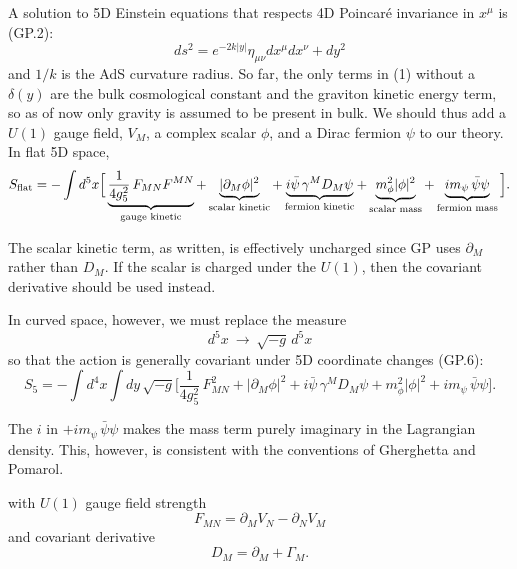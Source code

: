 \documentclass[11pt]{article}
\begin{document}
A solution to 5D Einstein equations that respects 4D Poincar\'e invariance in $x^{\mu}$ is (GP.2):
\begin{equation}
ds^{2}=e^{-2k|y|}\eta_{\mu\nu}dx^{\mu}dx^{\nu}+dy^{2}
\end{equation}
and $1/k$ is the AdS curvature radius. So far, the only terms in (1) without a $\delta(y)$ are the bulk cosmological constant and the graviton kinetic energy term, so as of now only gravity is assumed to be present in bulk. We should thus add a $U(1)$ gauge field, $V_M$, a complex scalar $\phi$, and a Dirac fermion $\psi$ to our theory.
In flat 5D space,
\begin{equation}
S_{\rm flat}
= -\int d^{5}x \Big[
\underbrace{\frac{1}{4g_5^{2}}\,F_{MN}F^{MN}}_{\text{gauge kinetic}}
+\underbrace{|\partial_M\phi|^{2}}_{\text{scalar kinetic}}
+\underbrace{i\bar{\psi}\,\gamma^{M}D_{M}\psi}_{\text{fermion kinetic}}
+\underbrace{m_\phi^{2}|\phi|^{2}}_{\text{scalar mass}}
+\underbrace{i m_\psi\,\bar{\psi}\psi}_{\text{fermion mass}}
\Big] .
\end{equation}
\begin{notationbox}
The scalar kinetic term, as written, is effectively uncharged since GP uses $\partial_M$ rather than $D_M$. If the scalar is charged under the $U(1)$, then the covariant derivative should be used instead.
\end{notationbox}
In curved space, however, we must replace the measure
\begin{equation}
d^{5}x \ \to\ \sqrt{-g}\,d^{5}x
\end{equation}
so that the action is generally covariant under 5D coordinate changes (GP.6):
\begin{equation}
S_{5}
= -\int d^{4}x\int dy\,\sqrt{-g}\Big[
\frac{1}{4g_5^{2}}\,F_{MN}^{2}
+|\partial_M\phi|^{2}
+i\bar{\psi}\,\gamma^{M}D_{M}\psi
+m_\phi^{2}|\phi|^{2}
+i m_\psi\,\bar{\psi}\psi
\Big] .
\label{GP6}
\end{equation}
\begin{notationbox}
The $i$ in $+i m_\psi\,\bar{\psi}\psi$ makes the mass term purely imaginary in the Lagrangian density. This, however, is consistent with the conventions of Gherghetta and Pomarol.
\end{notationbox}
with $U(1)$ gauge field strength
\begin{equation}
F_{MN}=\partial_M V_N-\partial_N V_M
\end{equation}
and covariant derivative
\begin{equation}
D_M=\partial_M+\Gamma_M .
\end{equation}
\end{document}
